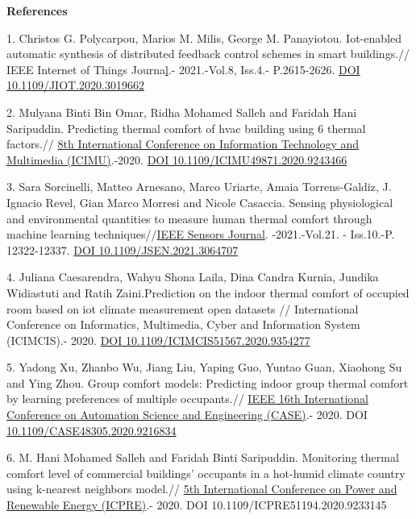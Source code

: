 {\bfseries References}

1. Christos G. Polycarpou, Marios M. Milis, George M. Panayiotou.
Iot-enabled automatic synthesis of distributed feedback control schemes
in smart buildings.// IEEE Internet of Things
Journa\href{https://ieeexplore.ieee.org/xpl/RecentIssue.jsp?punumber=6488907}{l}.-
2021.-Vol.8, Iss.4.- P.2615-2626.
\href{https://doi.org/10.1109/JIOT.2020.3019662}{DOI
10.1109/JIOT.2020.3019662}

2. Mulyana Binti Bin Omar, Ridha Mohamed Salleh and Faridah Hani
Saripuddin. Predicting thermal comfort of hvac building using 6 thermal
factors.//
\href{https://ieeexplore.ieee.org/xpl/conhome/9243083/proceeding}{8th
International Conference on Information Technology and Multimedia
(ICIMU)}.-2020.
\href{https://doi.org/10.1109/ICIMU49871.2020.9243466}{DOI
10.1109/ICIMU49871.2020.9243466}

3. Sara Sorcinelli, Matteo Arnesano, Marco Uriarte, Amaia
Torrens-Galdiz, J. Ignacio Revel, Gian Marco Morresi and Nicole
Casaccia. Sensing physiological and environmental quantities to measure
human thermal comfort through machine learning
techniques//\href{https://ieeexplore.ieee.org/xpl/RecentIssue.jsp?punumber=7361}{IEEE
Sensors Journal}. -2021.-Vol.21. - Iss.10.-P. 12322-12337.
\href{https://doi.org/10.1109/JSEN.2021.3064707}{DOI
10.1109/JSEN.2021.3064707}

4. Juliana Caesarendra, Wahyu Shona Laila, Dina Candra Kurnia, Jundika
Widiastuti and Ratih Zaini.Prediction on the indoor thermal comfort of
occupied room based on iot climate measurement open datasets //
International Conference on Informatics, Multimedia, Cyber and
Information System (ICIMCIS).- 2020.
\href{https://doi.org/10.1109/ICIMCIS51567.2020.9354277}{DOI
10.1109/ICIMCIS51567.2020.9354277}

5. Yadong Xu, Zhanbo Wu, Jiang Liu, Yaping Guo, Yuntao Guan, Xiaohong Su
and Ying Zhou. Group comfort models: Predicting indoor group thermal
comfort by learning preferences of multiple occupants.//
\href{\%20IEEE\%2016th\%20International\%20Conference\%20on\%20Automation\%20Science\%20and\%20Engineering\%20(CASE)}{IEEE
16th International Conference on Automation Science and Engineering
(CASE)}.- 2020. DOI
\href{https://doi.org/10.1109/CASE48305.2020.9216834}{10.1109/CASE48305.2020.9216834}

6. M. Hani Mohamed Salleh and Faridah Binti Saripuddin. Monitoring
thermal comfort level of commercial buildings' occupants in a hot-humid
climate country using k-nearest neighbors model.//
\href{https://ieeexplore.ieee.org/xpl/conhome/9233041/proceeding}{5th
International Conference on Power and Renewable Energy (ICPRE)}.- 2020.
DOI 10.1109/ICPRE51194.2020.9233145

